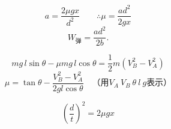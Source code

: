 \[a=\frac{2\mu gx}{d^2}\qquad\therefore\mu=\frac{ad^2}{2gx}\]
\[W_{\text{弹}}=\frac{ad^2}{2b}.\]

\[mg\,l\sin\theta-\mu mg\,l\cos\theta=\frac{1}{2}m\left(V_B^2-V_A^2\right)\]
\[\mu=\tan\theta-\frac{V_B^2-V_A^2}{2gl\cos\theta}\quad\text{（用}V_A\ V_B\ \theta\ l\ g\text{表示）}\]

\[\left(\frac{d}{t}\right)^2=2\mu gx\]
